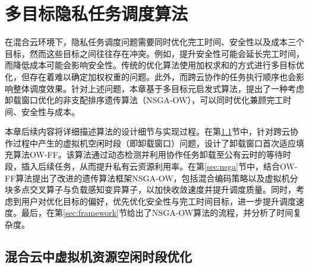 \chapter{多目标隐私任务调度算法}\label{chapter:alg}

在混合云环境下，隐私任务调度问题需要同时优化完工时间、安全性以及成本三个目标，然而这些目标之间往往存在冲突。例如，提升安全性可能会延长完工时间，而降低成本可能会影响安全性。传统的优化算法使用加权求和的方式进行多目标优化，但存在着难以确定加权权重的问题。此外，而跨云协作的任务执行顺序也会影响整体调度效果。针对上述问题，本章基于多目标元启发式算法，提出了一种考虑卸载窗口优化的非支配排序遗传算法（NSGA-OW），可以同时优化兼顾完工时间、安全性与成本。

本章后续内容将详细描述算法的设计细节与实现过程。在第\ref{sec:ow-ff}节中，针对跨云协作过程中产生的虚拟机空闲时段（即卸载窗口）问题，设计了卸载窗口首次适应填充算法OW-FF。该算法通过动态检测并利用协作任务卸载至公有云时的等待时段，插入后续任务，从而提升私有云资源利用率。在第\ref{sec:nsga}节中，结合OW-FF算法提出了改进的遗传算法框架NSGA-OW，包括混合编码策略以及虚拟机分块多点交叉算子与负载感知变异算子，以加快收敛速度并提升调度质量。同时，考虑到用户对优化目标的偏好，优先优化安全性与完工时间目标，进一步提升调度速度。最后，在第\ref{sec:framework}节给出了NSGA-OW算法的流程，并分析了时间复杂度。


\section{混合云中虚拟机资源空闲时段优化}\label{sec:ow-ff}


